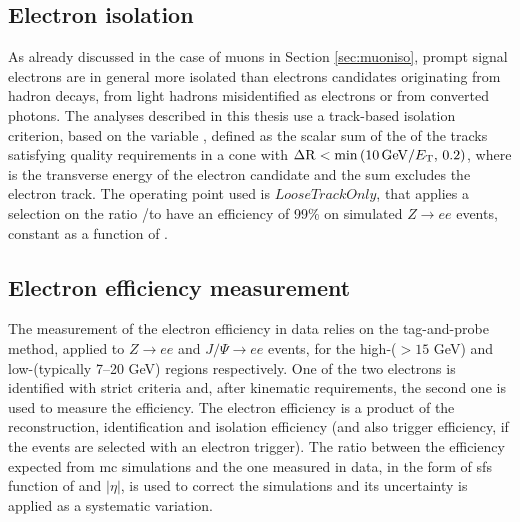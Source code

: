 \subsection{Electron isolation}

As already discussed in the case of muons in Section \ref{sec:muoniso}, prompt signal electrons are in general more isolated than 
electrons candidates originating from hadron decays, from light hadrons misidentified as electrons or from converted photons. 
The analyses described in this thesis use a track-based isolation criterion, based on the variable \ptvarele, defined as the scalar sum of the \pt 
of the tracks satisfying quality requirements in a cone with $\Delta\mathrm{R} < \min \left(  10 \, \mathrm{GeV}/E_{\rm T} , \, 0.2\right)$, where \et is the transverse energy of the electron candidate and the sum excludes the electron track. The operating point used is $LooseTrackOnly$, 
that applies a selection on the ratio \ptvarele/\et to have an efficiency of 99\% on simulated $Z\rightarrow e e$ events, constant as a function of \et.

\subsection{Electron efficiency measurement}

The measurement of the electron efficiency in data relies on the tag-and-probe method, applied to $Z\rightarrow e e$ and $J/\Psi \rightarrow e e$ events, for the high-\et ($> 15$ GeV) and low-\et (typically 7--20 GeV) regions respectively. One of the two electrons is identified with strict criteria and, after kinematic requirements, the second one is used to measure the efficiency.
The electron efficiency is a product of the reconstruction, identification and isolation efficiency 
(and also trigger efficiency, if the events are selected with an electron trigger).  The ratio between the efficiency expected from \gls{mc} simulations and the one measured in data, in the form of \glspl{sf} function of \et and $|\eta|$, is used to correct the simulations and its uncertainty is applied as a systematic variation. 

